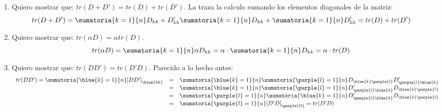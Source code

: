 \begin{enumerate}[label=(\alph*)]
  \item Quiero mostrar que: $tr(D + D') = tr(D) + tr(D')$.
        La traza la calculo sumando los elementos diagonales de la matriz:
        $$
          tr(D + D') =
          \sumatoria{k = 1}{n} D_{kk} + D'_{kk}
          \sumatoria{k = 1}{n}D_{kk} +
          \sumatoria{k = 1}{n}D'_{kk} =
          tr(D) + tr(D')
        $$

  \item Quiero mostrar que: $tr(\alpha D) = \alpha tr(D)$.
        $$
          tr(\alpha D) =
          \sumatoria{k = 1}{n} \alpha D_{kk} =
          \alpha \cdot \sumatoria{k = 1}{n}D_{kk} =
          \alpha \cdot tr(D)
        $$

  \item Quiero mostrar que: $tr(DD') = tr(D'D)$. Parecido a lo hecho antes:
        $$
          \begin{array}{rcl}
            tr(DD') =
            \sumatoria{\blue{k} = 1}{n} [DD']_{\blue{kk}} & = &
            \sumatoria{\blue{k} = 1}{n}
            \sumatoria{\purple{l} = 1}{n} D_{\blue{k}\purple{l}}D'_{\purple{l}\blue{k}} \\
                                                          & = &
            \sumatoria{\blue{k} = 1}{n}
            \sumatoria{\purple{l} = 1}{n} D'_{\purple{l}\blue{k}}D_{\blue{k}\purple{l}} \\
                                                          & = &
            \sumatoria{\purple{l} = 1}{n}
            \sumatoria{\blue{k} = 1}{n} D'_{\purple{l}\blue{k}}D_{\blue{k}\purple{l}}   \\
                                                          & = &
            \sumatoria{\purple{l} = 1}{n} [D'D]_{\purple{ll}}  = tr(D'D)
          \end{array}
        $$

\end{enumerate}

\begin{aportes}
  \item {}
\end{aportes}
